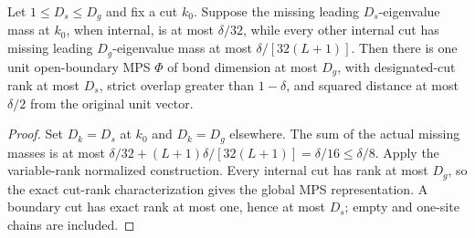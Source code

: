 \begin{lemma}
    \label{lem:designated_sequential_mass}
    \leanok
    Let $1\le D_s\le D_g$ and fix a cut $k_0$.
    Suppose the missing leading $D_s$-eigenvalue mass at $k_0$, when
    internal, is at most $\delta/32$, while every other internal cut
    has missing leading $D_g$-eigenvalue mass at most
    $\delta/[32(L+1)]$.
    Then there is one unit open-boundary MPS $\Phi$ of bond dimension
    at most $D_g$, with designated-cut rank at most $D_s$, strict
    overlap greater than $1-\delta$, and squared distance at most
    $\delta/2$ from the original unit vector.
\end{lemma}
\begin{proof}\leanok
    Set $D_k=D_s$ at $k_0$ and $D_k=D_g$ elsewhere. The sum of the
    actual missing masses is at most
    $\delta/32+(L+1)\delta/[32(L+1)]=\delta/16\le\delta/8$.
    Apply the variable-rank normalized construction.
    Every internal cut has rank at most $D_g$, so the exact cut-rank
    characterization gives the global MPS representation. A boundary
    cut has exact rank at most one, hence at most $D_s$; empty and
    one-site chains are included.
\end{proof}

